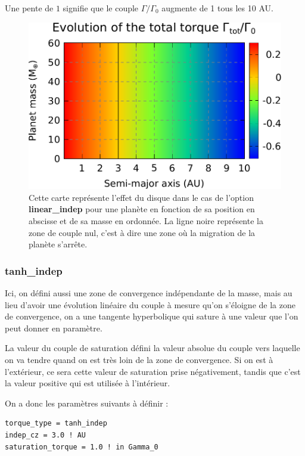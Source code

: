 Une pente de $1$ signifie que le couple $\Gamma/\Gamma_0$ augmente de 1 tous les 10 AU.

\begin{figure}[htb]
\centering
\includegraphics[width=0.65\linewidth]{figure/migration_map/linear_indep.pdf}
\caption{Cette carte représente l'effet du disque dans le cas de l'option \textbf{linear\_indep} pour une planète en fonction de sa position en abscisse et de sa masse en ordonnée. La ligne noire représente la zone de couple nul, c'est à dire une zone où la migration de la planète s'arrête.}
\end{figure}

\subsubsection{tanh\_indep}\label{sec:tanh_indep}
Ici, on défini aussi une zone de convergence indépendante de la masse, mais au lieu d'avoir une évolution linéaire du couple à mesure qu'on s'éloigne de la zone de convergence, on a une tangente hyperbolique qui sature à une valeur que l'on peut donner en paramètre. 

La valeur du couple de saturation défini la valeur absolue du couple vers laquelle on va tendre quand on est très loin de la zone de convergence. Si on est à l'extérieur, ce sera cette valeur de saturation prise négativement, tandis que c'est la valeur positive qui est utilisée à l'intérieur.

On a donc les paramètres suivants à définir : 
\begin{verbatim}
torque_type = tanh_indep
indep_cz = 3.0 ! AU
saturation_torque = 1.0 ! in Gamma_0
\end{verbatim}

